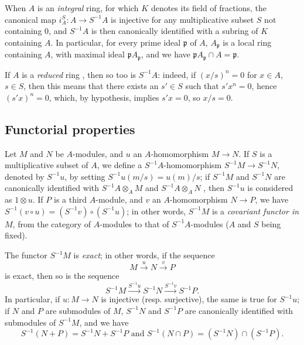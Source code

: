 \begin{env}[1.2.7]
\label{0.1.2.7}
When $A$ is an \emph{integral} ring, for which $K$ denotes its field of
fractions, the canonical map $i_A^S:A\to S^{-1}A$ is injective for any
multiplicative subset $S$ not containing $0$, and $S^{-1}A$ is then canonically identified
with a subring of $K$ containing $A$. In particular, for every prime
ideal $\mathfrak{p}$ of $A$, $A_\mathfrak{p}$ is a local ring containing $A$,
with maximal ideal $\mathfrak{p}A_\mathfrak{p}$, and we have
$\mathfrak{p}A_\mathfrak{p}\cap A=\mathfrak{p}$.
\end{env}

\begin{env}[1.2.8]
\label{0.1.2.8}
If $A$ is a \emph{reduced} ring , then so too is $S^{-1}A$: indeed, if
$(x/s)^n=0$ for $x\in A$, $s\in S$, then this means that there exists an
$s'\in S$ such that $s'x^n=0$, hence $(s'x)^n=0$, which, by hypothesis, implies
$s'x=0$, so $x/s=0$.
\end{env}

\subsection{Functorial properties}
\label{subsection:0.1.3}

\begin{env}[1.3.1]
\label{0.1.3.1}
Let $M$ and $N$ be $A$-modules, and $u$ an $A$-homomorphism $M\to N$. If $S$ is a
multiplicative subset of $A$, we define a $S^{-1}A$-homomorphism
$S^{-1}M\to S^{-1}N$, denoted by $S^{-1}u$, by setting $S^{-1}u(m/s)=u(m)/s$; if
$S^{-1}M$ and $S^{-1}N$ are canonically identified with $S^{-1}A\otimes_A M$ and
$S^{-1}A\otimes_A N$ , then $S^{-1}u$ is considered as $1\otimes u$.
If $P$ is a third $A$-module, and $v$ an $A$-homomorphism $N\to P$, we have
$S^{-1}(v\circ u)=(S^{-1}v)\circ(S^{-1}u)$; in other words, $S^{-1}M$ is a
\emph{covariant functor in $M$}, from the category of $A$-modules to that of
$S^{-1}A$-modules ($A$ and $S$ being fixed).
\end{env}

\begin{env}[1.3.2]
\label{0.1.3.2}
The functor $S^{-1}M$ is \emph{exact}; in other words, if the sequence
\[
  M\xrightarrow{u}N\xrightarrow{v}P
\]
is exact, then so is the sequence
\[
  S^{-1}M\xrightarrow{S^{-1}u}S^{-1}N\xrightarrow{S^{-1}v}S^{-1}P.
\]
In particular, if $u:M\to N$ is injective (resp. surjective), the same is true
for $S^{-1}u$;
if $N$ and $P$ are submodules of $M$, $S^{-1}N$ and $S^{-1}P$ are canonically identified with submodules of $S^{-1}M$, and we have
\[
  S^{-1}(N+P)=S^{-1}N+S^{-1}P\text{ and }S^{-1}(N\cap P)=(S^{-1}N)\cap(S^{-1}P).
\]
\end{env}


